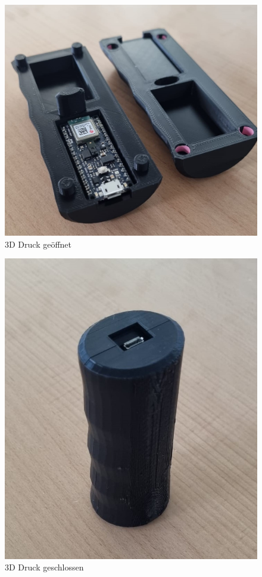 \begin{minipage}[l]{0.49\textwidth}
  \begin{figure}[H]
    \begin{center}
      \includegraphics[width=1\linewidth]{content/images/3DPrint_open.jpeg}
      \caption{3D Druck geöffnet}
    \end{center}
  \end{figure}
\end{minipage}
\begin{minipage}[r]{0.5\textwidth}
  \begin{figure}[H]
    \begin{center}
      \includegraphics[width=0.8\linewidth]{content/images/3DPrint_closed.jpeg}
      \caption{3D Druck geschlossen}
    \end{center}
  \end{figure}
\end{minipage}
